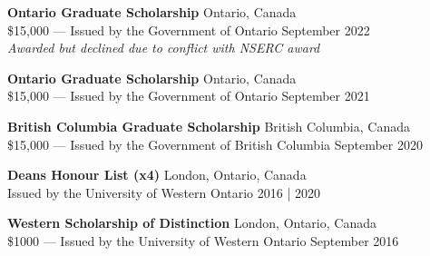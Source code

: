 \documentclass[a4paper,9pt]{extarticle}
\begin{document}
\noindent
\begin{minipage}{1\textwidth}
\setlength{\parindent}{15pt} %
	\noindent
	\textbf{Ontario Graduate Scholarship}  \hfill Ontario, Canada\\ 
	\$15,000 --- Issued by the Government of Ontario \hfill September 2022\\ 
	\textit{Awarded but declined due to conflict with NSERC award}\\ 
\end{minipage}

\noindent
\begin{minipage}{1\textwidth}
\setlength{\parindent}{15pt} %
	\noindent
	\textbf{Ontario Graduate Scholarship}  \hfill Ontario, Canada\\ 
	\$15,000 --- Issued by the Government of Ontario \hfill September 2021\\ 
\end{minipage}

\noindent
\begin{minipage}{1\textwidth}
\setlength{\parindent}{15pt} %
	\noindent
	\textbf{British Columbia Graduate Scholarship}  \hfill British Columbia, Canada\\ 
	\$15,000 --- Issued by the Government of British Columbia \hfill September 2020\\ 
\end{minipage}

\noindent
\begin{minipage}{1\textwidth}
\setlength{\parindent}{15pt} %
	\noindent
	\textbf{Deans Honour List (x4)}  \hfill London, Ontario, Canada\\ 
	Issued by the University of Western Ontario \hfill 2016 | 2020\\ 
\end{minipage}

\noindent
\begin{minipage}{1\textwidth}
\setlength{\parindent}{15pt} %
	\noindent
	\textbf{Western Scholarship of Distinction}  \hfill London, Ontario, Canada\\ 
	\$1000 --- Issued by the University of Western Ontario \hfill September 2016
\end{minipage}
\end{document}

